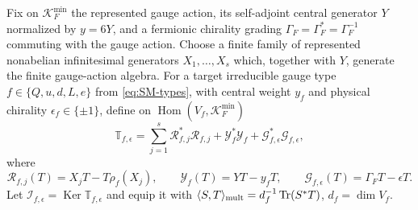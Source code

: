 \documentclass[11pt]{article}
\numberwithin{equation}{section}
\theoremstyle{definition}
\theoremstyle{remark}
\newcommand{\Tr}{\operatorname{Tr}}
\newcommand{\Ker}{\operatorname{Ker}}
\newcommand{\Hom}{\operatorname{Hom}}
\begin{document}
Fix on $\mathcal K_F^{\min}$ the represented gauge action, its self-adjoint
central generator $Y$ normalized by $y=6Y$, and a fermionic chirality grading
$\Gamma_F=\Gamma_F^*=\Gamma_F^{-1}$ commuting with the gauge action.  Choose a
finite family of represented nonabelian infinitesimal generators
$X_1,\ldots,X_s$ which, together with $Y$, generate the finite gauge-action
algebra.  For a target irreducible gauge type
$f\in\{Q,u,d,L,e\}$ from \eqref{eq:SM-types}, with central weight $y_f$ and
physical chirality $\epsilon_f\in\{\pm1\}$, define on
$\Hom(V_f,\mathcal K_F^{\min})$
\begin{equation}
 \mathbb T_{f,\epsilon}
 =\sum_{j=1}^s\mathcal R_{f,j}^*\mathcal R_{f,j}
  +\mathcal Y_f^*\mathcal Y_f
  +\mathcal G_{f,\epsilon}^*\mathcal G_{f,\epsilon},
 \label{eq:canonical-type-tester}
\end{equation}
where
\[
 \mathcal R_{f,j}(T)=X_jT-T\rho_f(X_j),\qquad
 \mathcal Y_f(T)=YT-y_fT,\qquad
 \mathcal G_{f,\epsilon}(T)=\Gamma_FT-\epsilon T.
\]
Let $\mathcal I_{f,\epsilon}=\Ker\mathbb T_{f,\epsilon}$ and equip it with
$\langle S,T\rangle_{\rm mult}=d_f^{-1}\Tr(S^*T)$,
$d_f=\dim V_f$.
\end{document}
